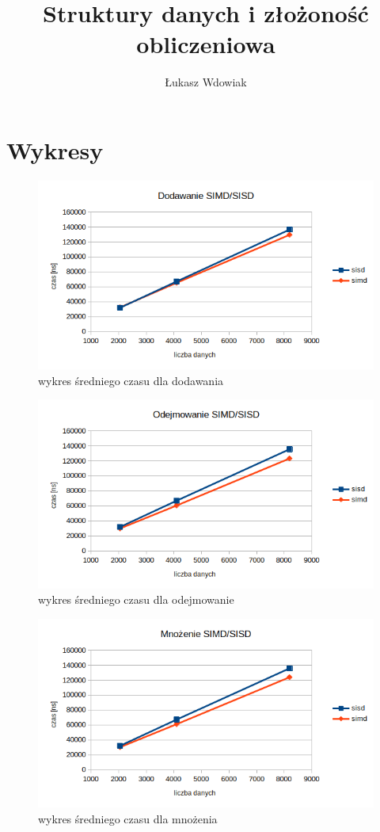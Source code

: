 \documentclass[11pt]{article}
\begin{document}
\title{Struktury danych i złożoność obliczeniowa}
\author{Łukasz Wdowiak}

\section{Wykresy}
\begin{figure}[H]
    \includegraphics[width=13cm]{images/dodawanie.png}
    \caption{wykres średniego czasu dla dodawania}
\end{figure}
\begin{figure}[H]
    \includegraphics[width=13cm]{images/odejmowanie.png}
    \caption{wykres średniego czasu dla odejmowanie}
\end{figure}
\begin{figure}[H]
    \includegraphics[width=13cm]{images/mnozenie.png}
    \caption{wykres średniego czasu dla mnożenia}
\end{figure}
\end{document}
